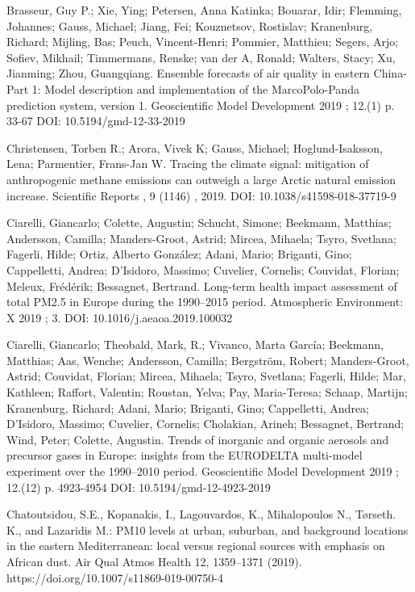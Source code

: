 \begin{list}{}{\setlength{\leftmargin}{15pt}\setlength{\itemindent}{-\leftmargin}}
\item[]
Brasseur, Guy P.; Xie, Ying; Petersen, Anna Katinka; Bouarar, Idir; Flemming, Johannes; Gauss, Michael; Jiang, Fei; Kouznetsov, Rostislav; Kranenburg, Richard; Mijling, Bas; Peuch, Vincent-Henri; Pommier, Matthieu; Segers, Arjo; Sofiev, Mikhail; Timmermans, Renske; van der A, Ronald; Walters, Stacy; Xu, Jianming; Zhou, Guangqiang.
Ensemble forecasts of air quality in eastern China-Part 1: Model description and implementation of the MarcoPolo-Panda prediction system, version 1.
Geoscientific Model Development 2019 ; 12.(1) p. 33-67
DOI: 10.5194/gmd-12-33-2019

\item[]
Christensen, Torben R.; Arora, Vivek K; Gauss, Michael; Hoglund-Isaksson, Lena; Parmentier, Frans-Jan W.
Tracing the climate signal: mitigation of anthropogenic methane emissions can outweigh a large Arctic natural emission increase.
Scientific Reports , 9 (1146) , 2019.
DOI: 10.1038/s41598-018-37719-9

\item[]
Ciarelli, Giancarlo; Colette, Augustin; Schucht, Simone; Beekmann, Matthias; Andersson, Camilla; Manders-Groot, Astrid; Mircea, Mihaela; Tsyro, Svetlana; Fagerli, Hilde; Ortiz, Alberto González; Adani, Mario; Briganti, Gino; Cappelletti, Andrea; D'Isidoro, Massimo; Cuvelier, Cornelis; Couvidat, Florian; Meleux, Frédérik; Bessagnet, Bertrand.
Long-term health impact assessment of total PM2.5 in Europe during the 1990–2015 period.
Atmospheric Environment: X 2019 ; 3.
DOI: 10.1016/j.aeaoa.2019.100032

\item[]
Ciarelli, Giancarlo; Theobald, Mark, R.; Vivanco, Marta García; Beekmann, Matthias; Aas, Wenche; Andersson, Camilla; Bergström, Robert; Manders-Groot, Astrid; Couvidat, Florian; Mircea, Mihaela; Tsyro, Svetlana; Fagerli, Hilde; Mar, Kathleen; Raffort, Valentin; Roustan, Yelva; Pay, Maria-Teresa; Schaap, Martijn; Kranenburg, Richard; Adani, Mario; Briganti, Gino; Cappelletti, Andrea; D'Isidoro, Massimo; Cuvelier, Cornelis; Cholakian, Arineh; Bessagnet, Bertrand; Wind, Peter; Colette, Augustin.
Trends of inorganic and organic aerosols and precursor gases in Europe: insights from the EURODELTA multi-model experiment over the 1990–2010 period.
Geoscientific Model Development 2019 ; 12.(12) p. 4923-4954
DOI: 10.5194/gmd-12-4923-2019

\item[]
Chatoutsidou, S.E., Kopanakis, I., Lagouvardos, K., Mihalopoulos N., Tørseth. K., and Lazaridis M.:
PM10 levels at urban, suburban, and background locations in the eastern Mediterranean: local versus regional sources with emphasis on African dust. 
Air Qual Atmos Health 12, 1359–1371 (2019). 
https://doi.org/10.1007/s11869-019-00750-4


\end{list}
